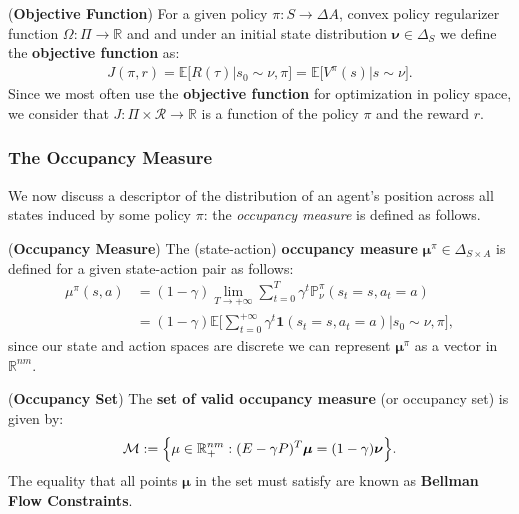 \begin{definition}
    (\textbf{Objective Function})
    For a given policy $\pi:S\rightarrow \Delta A$, convex policy regularizer function $\Omega: \Pi \rightarrow \mathbb{R}$ and and under an initial state distribution $\bm{\nu} \in \Delta_S$ we define the \textbf{objective function} as:
    \begin{align*}
        J(\pi,r) = \mathbb{E}\Big[ R(\tau) \Big| s_0 \sim \nu, \pi \Big] =  \mathbb{E}\Big[ V^\pi(s) \Big| s \sim \nu\Big].
    \end{align*}
    Since we most often use the \textbf{objective function} for optimization in policy space, we consider that $J:\Pi \times \mathcal{R} \rightarrow \mathbb{R}$ is a function of the policy $\pi$ and the reward $r$.
\end{definition}

\subsubsection{The Occupancy Measure}

We now discuss a descriptor of the distribution of an agent's position across all states induced by some policy $\pi$: the \textit{occupancy measure} is defined as follows.

\begin{definition}
    (\textbf{Occupancy Measure}) 
    The (state-action) \textbf{occupancy measure} $\bm{\mu}^\pi \in \Delta_{S \times A}$ is defined for a given state-action pair as follows:
    \begin{align*}
        \mu^\pi(s,a) &= (1-\gamma) \lim_{T \rightarrow + \infty} \sum_{t=0}^T \gamma^t \mathbb{P}_\nu^\pi(s_t=s,a_t=a) 
        \\
        &= (1-\gamma) \mathbb{E} \Big[ \sum_{t=0}^{+\infty} \gamma^t \mathbf{1}(s_t=s,a_t=a) \Big| s_0 \sim \nu, \pi\Big],
    \end{align*}
    since our state and action spaces are discrete we can represent $\bm{\mu}^{\pi}$ as a vector in $\mathbb{R}^{nm}$. 
\end{definition}

\begin{definition}
    \label{def:occupancy_set}
    (\textbf{Occupancy Set})
    The \textbf{set of valid occupancy measure} (or occupancy set) is given by:
    \begin{align*}
        \mathcal{M} := \Bigl\{ \mu \in \mathbb{R}_+^{nm} : (E-\gamma P)^T \bm{\mu} = (1-\gamma) \bm{\nu} \Bigr\}.
    \end{align*}
    The equality that all points $\bm{\mu}$ in the set must satisfy are known as \textbf{Bellman Flow Constraints}.
\end{definition}

